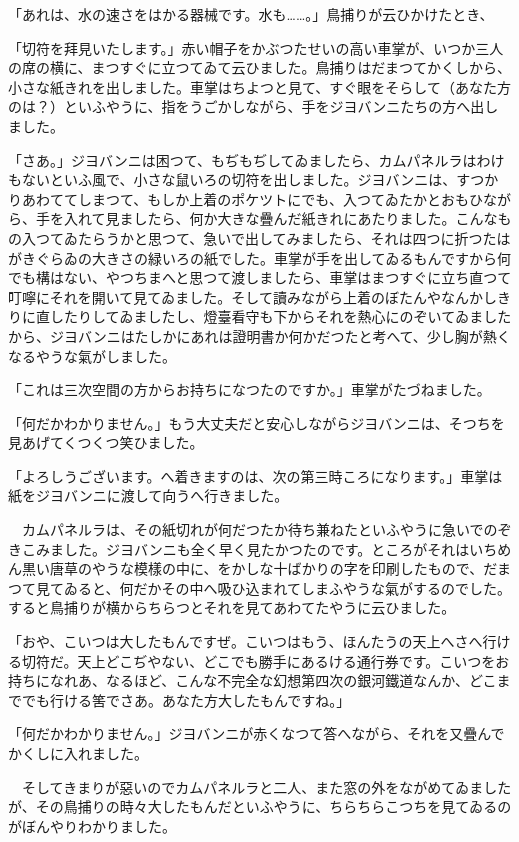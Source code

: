 \documentclass[tate,paper=b6j,jafontsize=9pt]{jlreq}
\begin{document}
「あれは、水の速さをはかる器械です。水も……。」鳥捕りが云ひかけたとき、

「切符を拜見いたします。」赤い帽子をかぶつたせいの高い車掌が、いつか三人の席の横に、まつすぐに立つてゐて云ひました。鳥捕りはだまつてかくしから、小さな紙きれを出しました。車掌はちよつと見て、すぐ眼をそらして（あなた方のは？）といふやうに、指をうごかしながら、手をジヨバンニたちの方へ出しました。

「さあ。」ジヨバンニは困つて、もぢもぢしてゐましたら、カムパネルラはわけもないといふ風で、小さな鼠いろの切符を出しました。ジヨバンニは、すつかりあわててしまつて、もしか上着のポケツトにでも、入つてゐたかとおもひながら、手を入れて見ましたら、何か大きな疊んだ紙きれにあたりました。こんなもの入つてゐたらうかと思つて、急いで出してみましたら、それは四つに折つたはがきぐらゐの大きさの緑いろの紙でした。車掌が手を出してゐるもんですから何でも構はない、やつちまへと思つて渡しましたら、車掌はまつすぐに立ち直つて叮嚀にそれを開いて見てゐました。そして讀みながら上着のぼたんやなんかしきりに直したりしてゐましたし、燈臺看守も下からそれを熱心にのぞいてゐましたから、ジヨバンニはたしかにあれは證明書か何かだつたと考へて、少し胸が熱くなるやうな氣がしました。

「これは三次空間の方からお持ちになつたのですか。」車掌がたづねました。

「何だかわかりません。」もう大丈夫だと安心しながらジヨバンニは、そつちを見あげてくつくつ笑ひました。

「よろしうございます。へ着きますのは、次の第三時ころになります。」車掌は紙をジヨバンニに渡して向うへ行きました。

　カムパネルラは、その紙切れが何だつたか待ち兼ねたといふやうに急いでのぞきこみました。ジヨバンニも全く早く見たかつたのです。ところがそれはいちめん黒い唐草のやうな模樣の中に、をかしな十ばかりの字を印刷したもので、だまつて見てゐると、何だかその中へ吸ひ込まれてしまふやうな氣がするのでした。すると鳥捕りが横からちらつとそれを見てあわてたやうに云ひました。

「おや、こいつは大したもんですぜ。こいつはもう、ほんたうの天上へさへ行ける切符だ。天上どこぢやない、どこでも勝手にあるける通行券です。こいつをお持ちになれあ、なるほど、こんな不完全な幻想第四次の銀河鐵道なんか、どこまででも行ける筈でさあ。あなた方大したもんですね。」

「何だかわかりません。」ジヨバンニが赤くなつて答へながら、それを又疊んでかくしに入れました。

　そしてきまりが惡いのでカムパネルラと二人、また窓の外をながめてゐましたが、その鳥捕りの時々大したもんだといふやうに、ちらちらこつちを見てゐるのがぼんやりわかりました。
\end{document}
